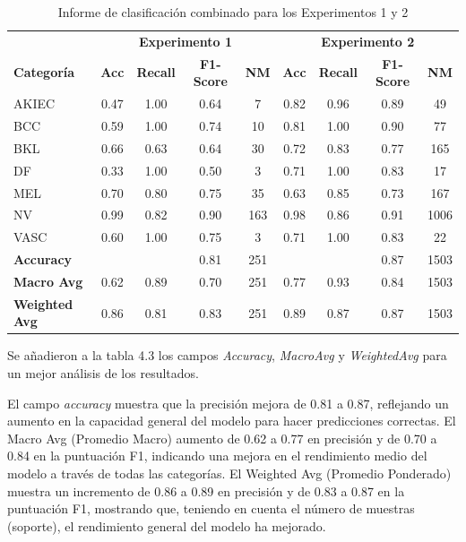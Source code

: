 \begin{table}[ht]
    \small
    \centering
    \caption{Informe de clasificación combinado para los Experimentos 1 y 2}
    \label{tab:classification_report_combined}
    \begin{tabular}{lcccccccc}
    \hline
    & \multicolumn{4}{c}{\textbf{Experimento 1}} & \multicolumn{4}{c}{\textbf{Experimento 2}} \\
    \cline{2-9}
    \textbf{Categoría} & \textbf{Acc} & \textbf{Recall} & \textbf{F1-Score} & \textbf{NM} & \textbf{Acc} & \textbf{Recall} & \textbf{F1-Score} & \textbf{NM} \\
    \hline
    AKIEC & 0.47 & 1.00 & 0.64 & 7   & 0.82 & 0.96 & 0.89 & 49 \\
    BCC   & 0.59 & 1.00 & 0.74 & 10  & 0.81 & 1.00 & 0.90 & 77 \\
    BKL   & 0.66 & 0.63 & 0.64 & 30  & 0.72 & 0.83 & 0.77 & 165 \\
    DF    & 0.33 & 1.00 & 0.50 & 3   & 0.71 & 1.00 & 0.83 & 17 \\
    MEL   & 0.70 & 0.80 & 0.75 & 35  & 0.63 & 0.85 & 0.73 & 167 \\
    NV    & 0.99 & 0.82 & 0.90 & 163 & 0.98 & 0.86 & 0.91 & 1006 \\
    VASC  & 0.60 & 1.00 & 0.75 & 3   & 0.71 & 1.00 & 0.83 & 22 \\
    \hline
    \textbf{Accuracy} & & & 0.81 & 251 & & & 0.87 & 1503 \\
    \textbf{Macro Avg} & 0.62 & 0.89 & 0.70 & 251 & 0.77 & 0.93 & 0.84 & 1503 \\
    \textbf{Weighted Avg} & 0.86 & 0.81 & 0.83 & 251 & 0.89 & 0.87 & 0.87 & 1503 \\
    \hline
    \end{tabular}
\end{table}

Se añadieron a la tabla 4.3 los campos \textit{Accuracy}, \textit{MacroAvg} y \textit{WeightedAvg} para un mejor análisis de los resultados. 

El campo \textit{accuracy} muestra que la precisión mejora de 0.81 a 0.87, reflejando un aumento en la capacidad general del modelo para hacer predicciones correctas. El Macro Avg (Promedio Macro) aumento de 0.62 a 0.77 en precisión y de 0.70 a 0.84 en la puntuación F1, indicando una mejora en el rendimiento medio del modelo a través de todas las categorías. El Weighted Avg (Promedio Ponderado) muestra un incremento de 0.86 a 0.89 en precisión y de 0.83 a 0.87 en la puntuación F1, mostrando que, teniendo en cuenta el número de muestras (soporte), el rendimiento general del modelo ha mejorado.

